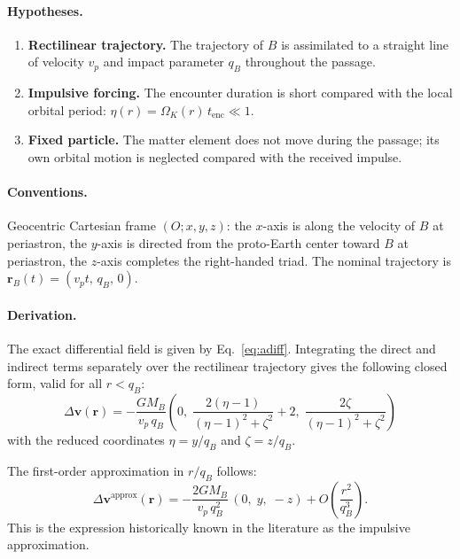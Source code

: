 \documentclass[11pt,a4paper,openany]{report}
\begin{document}
\paragraph{Hypotheses.}
\begin{enumerate}
\item \textbf{Rectilinear trajectory.} The trajectory of $B$ is assimilated to a straight line of
velocity $v_p$ and impact parameter $q_B$ throughout the passage.
\item \textbf{Impulsive forcing.} The encounter duration is short compared with the local orbital
period: $\eta(r)=\Omega_K(r)\,t_{\mathrm{enc}}\ll1$.
\item \textbf{Fixed particle.} The matter element does not move during the passage; its own orbital
motion is neglected compared with the received impulse.
\end{enumerate}

\paragraph{Conventions.}
Geocentric Cartesian frame $(O;x,y,z)$: the $x$-axis is along the velocity of $B$ at periastron,
the $y$-axis is directed from the proto-Earth center toward $B$ at periastron, the $z$-axis
completes the right-handed triad. The nominal trajectory is
$\mathbf{r}_B(t)=(v_p t,\,q_B,\,0)$.

\paragraph{Derivation.}
The exact differential field is given by Eq.~\eqref{eq:adiff}. Integrating the direct and indirect
terms separately over the rectilinear trajectory gives the following closed form, valid for all
$r<q_B$:
\begin{equation}
\boxed{\;
\Delta\mathbf{v}(\mathbf{r})
=
-\frac{GM_B}{v_p\,q_B}
\left(
0,\;
\frac{2(\eta-1)}{(\eta-1)^2+\zeta^2}+2,\;
\frac{2\zeta}{(\eta-1)^2+\zeta^2}
\right)
\;}
\label{eq:impulsion-close}
\end{equation}
with the reduced coordinates $\eta=y/q_B$ and $\zeta=z/q_B$.

The first-order approximation in $r/q_B$ follows:
\begin{equation}
\Delta\mathbf{v}^{\text{approx}}(\mathbf{r})
=
-\frac{2GM_B}{v_p\,q_B^2}\,(0,\;y,\;-z)
+
O\!\left(\frac{r^2}{q_B^3}\right).
\label{eq:impulsion-first-order}
\end{equation}
This is the expression historically known in the literature as the impulsive approximation.
\end{document}
